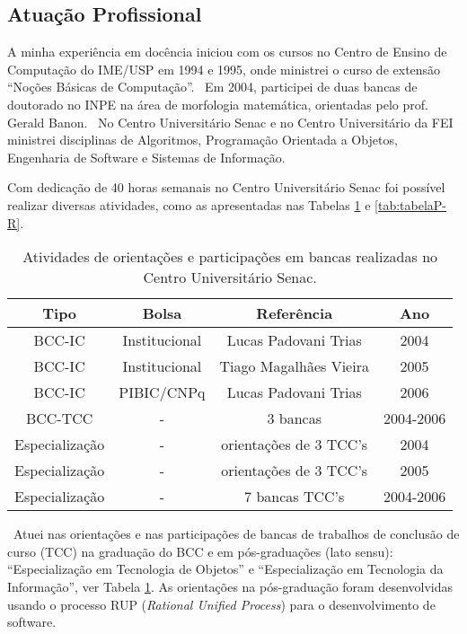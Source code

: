 \subsection{Atuação Profissional}\label{sec:profissionalAntes}

A minha experiência em docência iniciou com os cursos no Centro de Ensino de Computação do IME/USP em 1994 e 1995, onde ministrei o curso de extensão  ``Noções Básicas de Computação''.
\
Em 2004, participei de duas bancas de doutorado no INPE na área de morfologia matemática, orientadas pelo prof. Gerald Banon.
\
No Centro Universitário Senac e no Centro Universitário da FEI ministrei disciplinas de Algoritmos, Programação Orientada a Objetos, Engenharia de Software e Sistemas de Informação. 

Com dedicação de 40 horas semanais no Centro Universitário Senac foi possível realizar diversas atividades, como as apresentadas nas Tabelas 
\ref{tab:tabelaP} e \ref{tab:tabelaP-R}.
\
\begin{table}[!ht]
   \centering
   \caption{Atividades de orientações e participações em bancas realizadas no Centro Universitário Senac.}\label{tab:tabelaP}
\begin{tabular}{|c|c|c|c|}
\hline
\textbf{Tipo} & \textbf{Bolsa} & \textbf{Referência} & Ano\\ \hline
  BCC-IC & Institucional &  Lucas Padovani Trias & 2004 \\ \hline
  BCC-IC & Institucional &  Tiago Magalhães Vieira & 2005 \\ \hline
  BCC-IC & PIBIC/CNPq &  Lucas Padovani Trias & 2006 \\ \hline
  BCC-TCC            & - & 3 bancas & 2004-2006 \\ \hline
  Especialização & - & orientações de 3 TCC's & 2004 \\ \hline
  Especialização & - & orientações de 3 TCC's & 2005 \\ \hline
  Especialização & - & 7 bancas TCC's & 2004-2006 \\ \hline
\end{tabular}
\end{table}
\
Atuei nas orientações e nas participações de bancas de trabalhos de conclusão de curso (TCC) na graduação do BCC e em pós-graduações (lato sensu): ``Especialização em Tecnologia de Objetos'' e ``Especialização em Tecnologia da Informação'', ver Tabela \ref{tab:tabelaP}. As orientações na pós-graduação foram desenvolvidas usando o processo RUP (\textit{Rational Unified Process}) para o desenvolvimento de software.
